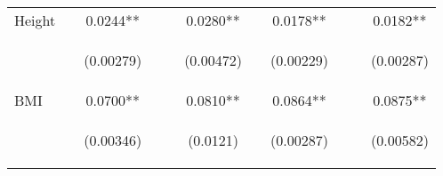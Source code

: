 \documentclass{article}[11pt,subeqn]
\begin{document}
\begin{spacing}{1.5}
\begin{sidewaystable}[!htbp]
\begin{center}
\begin{tabular}{lcccccccccc}
Height	&		&	0.0244**	&		&		&	0.0280**	&		&	0.0178**	&		&		&	0.0182**	\\
\vspace{4pt} & \begin{footnotesize}			\end{footnotesize} & \begin{footnotesize}	(0.00279)	\end{footnotesize} & \begin{footnotesize}		\end{footnotesize} & \begin{footnotesize}		\end{footnotesize} & \begin{footnotesize}	(0.00472)	\end{footnotesize} & \begin{footnotesize}		\end{footnotesize} & \begin{footnotesize}	(0.00229)	\end{footnotesize} & \begin{footnotesize}		\end{footnotesize} & \begin{footnotesize}		\end{footnotesize} & \begin{footnotesize}	(0.00287)	\end{footnotesize} \\
BMI	&		&	0.0700**	&		&		&	0.0810**	&		&	0.0864**	&		&		&	0.0875**	\\
\vspace{4pt} & \begin{footnotesize}			\end{footnotesize} & \begin{footnotesize}	(0.00346)	\end{footnotesize} & \begin{footnotesize}		\end{footnotesize} & \begin{footnotesize}		\end{footnotesize} & \begin{footnotesize}	(0.0121)	\end{footnotesize} & \begin{footnotesize}		\end{footnotesize} & \begin{footnotesize}	(0.00287)	\end{footnotesize} & \begin{footnotesize}		\end{footnotesize} & \begin{footnotesize}		\end{footnotesize} & \begin{footnotesize}	(0.00582)	\end{footnotesize} \\

\end{tabular}
\end{center}
\end{sidewaystable}
\end{spacing}
\end{document}

